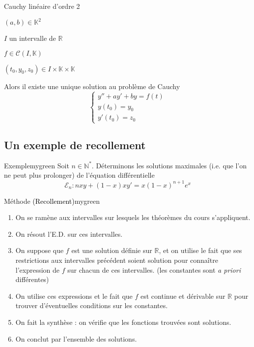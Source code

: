     \begin{theo}{Cauchy linéaire d’ordre 2}{}
        \begin{soient}
            \item $(a,b) \in \mathbb{K}^2$
            \item $I$ un intervalle de $\mathbb{R}$
            \item $f \in \mathcal{C}(I,\mathbb{K})$
            \item $(t_0,y_0,z_0) \in I \times \mathbb{K} \times \mathbb{K}$
        \end{soient}
        Alors il existe une unique solution au problème de Cauchy \[ \left\{ \begin{array}{l}
        y'' + ay' + by = f(t)\\
        y(t_0) = y_0\\
        y'(t_0) = z_0
        \end{array} \right. \]
    \end{theo}
    
\subsection{Un exemple de recollement}

    \begin{omed}{Exemple}{mygreen}
        Soit $n \in \mathbb{N}^*$. Déterminons les solutions maximales (i.e. que l’on ne peut plus prolonger) de l’équation différentielle 
        \[ \mathcal{E}_n : nxy + (1-x)xy' = x(1-x)^{n+1}e^x \] 
    \end{omed}
    
        \begin{omed}{Méthode \textcolor{black}{(Recollement)}}{mygreen}
            \begin{enumerate}
                \item On se ramène aux intervalles sur lesquels les théorèmes du cours s’appliquent.
                \item On résout l’E.D. sur ces intervalles.
                \item On suppose que $f$ est une solution définie sur $\mathbb{R}$, et on utilise le fait que ses restrictions aux intervalles précédent soient solution pour connaître l’expression de $f$ sur chacun de ces intervalles. (les constantes sont \textit{a priori} différentes)
                \item On utilise ces expressions et le fait que $f$ est continue et dérivable sur $\mathbb{R}$ pour trouver d’éventuelles conditions sur les constantes.
                \item On fait la synthèse : on vérifie que les fonctions trouvées sont solutions. 
                \item On conclut par l’ensemble des solutions.
            \end{enumerate}
        \end{omed}
    
